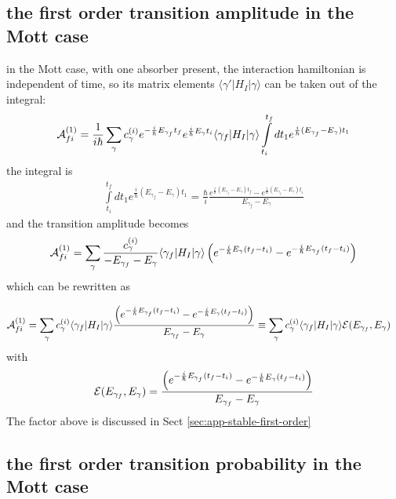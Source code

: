 \subsection{the first order transition amplitude in the Mott case }
in the Mott case, with one absorber present, the interaction hamiltonian is independent of time, so its matrix elements \(\langle \gamma' |H_I| \gamma\rangle\) can be taken out of the integral:
\begin{align}
    {\cal A}_{fi}^{(1)} = \frac{1}{i\hbar} \sum\limits_{\gamma} c_{\gamma}^{(i)}e^{-\frac{i}{\hbar}E_{\gamma_f} t_f}e^{\frac{i}{\hbar}E_{\gamma} t_i} \langle \gamma_f|H_I|\gamma\rangle\int\limits_{t_i}^{t_f}dt_1e^{\frac{i}{\hbar}(E_{\gamma_f}-E_{\gamma} )t_1}
\end{align}
the integral is
\begin{align}
    \int\limits_{t_i}^{t_f}dt_1e^{\frac{i}{\hbar}(E_{\gamma_f}-E_{\gamma} )t_1}= \frac{\hbar}i\frac{e^{\frac{i}\hbar (E_{\gamma_f} -E_{\gamma})t_f}-e^{\frac{i}\hbar (E_{\gamma_f} -E_{\gamma})t_i}}{E_{\gamma_f}-  E_{\gamma}}
\end{align}
and the transition amplitude becomes
\begin{align}
    {\cal A}_{fi}^{(1)} = \sum_\gamma \frac{c_\gamma^{(i)}}{-E_{\gamma_f}- E_{\gamma}} \langle \gamma_f|H_I|\gamma\rangle  \left(e^{-\frac{i}{\hbar}E_{\gamma}(t_f-t_i)}-e^{-\frac{i}{\hbar}E_{\gamma_f}(t_f-t_i)}\right)
\end{align}
which can be rewritten as
\begin{importantbox}
    \begin{align}
        {\cal A}_{fi}^{(1)} & =\sum_\gamma {c_\gamma^{(i)}}\langle \gamma_f|H_I|\gamma\rangle  \frac{\left(e^{-\frac{i}{\hbar}E_{\gamma_f}(t_f-t_i)}-e^{-\frac{i}{\hbar}{ E_\gamma}(t_f-t_i)} \right)}{{E_{\gamma_f}- E_\gamma}} \equiv \sum_\gamma {c_\gamma^{(i)}}\langle \gamma_f|H_I|\gamma\rangle   {\cal E}(E_{\gamma_f},E_{\gamma})\label{eq:gen-first-order-amplitude}
    \end{align}
    with
    \begin{align}
        {\cal E}(E_{\gamma_f},E_\gamma) = \frac{\left(e^{-\frac{i}{\hbar}E_{\gamma_f}(t_f-t_i)}-e^{-\frac{i}{\hbar}{ E_\gamma}(t_f-t_i)} \right)}{{E_{\gamma_f}- E_\gamma}}
    \end{align}
    The factor above is discussed in Sect \ref{sec:app-stable-first-order}
\end{importantbox}

\subsection{the first order transition probability in the Mott case }

